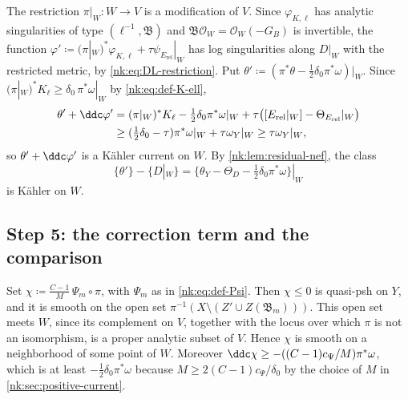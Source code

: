 The restriction $\pi|_W\colon W\to V$ is a modification of $V$.
Since $\varphi_{K,\ell}$ has analytic singularities of type
$(\ell^{-1},\mathfrak B)$ and $\mathfrak B\mathcal O_W=\mathcal O_W(-G_B)$ is invertible, the
function
$\varphi'\coloneqq (\pi|_W)^*\varphi_{K,\ell}+\tau\psi_{E_{{\mathrm{rel}}}}|_W$
has log singularities along $D|_W$ with the restricted metric, by
\eqref{nk:eq:DL-restriction}. Put
$\theta'\coloneqq (\pi^*\theta-\tfrac12\delta_0\pi^*\omega)|_W$. Since
$(\pi|_W)^*K_\ell\ge\delta_0\,\pi^*\omega|_W$ by \eqref{nk:eq:def-K-ell},
\[
 \begin{aligned}
  \theta'+\ddc\varphi'
  &=(\pi|_W)^*K_\ell-\tfrac12\delta_0\pi^*\omega|_W
   +\tau\bigl([E_{{\mathrm{rel}}}|_W]-\Theta_{E_{{\mathrm{rel}}}}|_W\bigr)\\
  &\ge(\tfrac12\delta_0-\tau)\pi^*\omega|_W+\tau\omega_Y|_W
  \ge\tau\omega_Y|_W ,
 \end{aligned}
\]
so $\theta'+\ddc\varphi'$ is a K\"ahler current on $W$. By
\cref{nk:lem:residual-nef}, the class
\begin{equation}\label{nk:eq:AW-class}
  \{\theta'\}-\{D|_W\}
  =\{\theta_Y-\Theta_D-\tfrac12\delta_0\pi^*\omega\}|_W
\end{equation}
is K\"ahler on $W$.

\subsection*{Step 5: the correction term and the comparison}

Set $\chi\coloneqq \frac{C-1}M\,\Psi_m\circ\pi$,
with $\Psi_m$ as in \eqref{nk:eq:def-Psi}. Then $\chi\le0$ is quasi-psh
on $Y$, and it is smooth on the open set
$\pi^{-1}(X\setminus(Z'\cup Z(\mathfrak B_m)))$. This open set meets
$W$, since its complement on $V$, together with the locus over which
$\pi$ is not an isomorphism, is a proper analytic subset of $V$.
Hence $\chi$ is smooth on a neighborhood of some point of $W$. Moreover
$\ddc\chi\ge-((C-1)c_\Psi/M)\pi^*\omega$, which is at least
$-\tfrac12\delta_0\pi^*\omega$ because
$M\ge2(C-1)c_\Psi/\delta_0$ by the choice of $M$ in
\cref{nk:sec:positive-current}.

